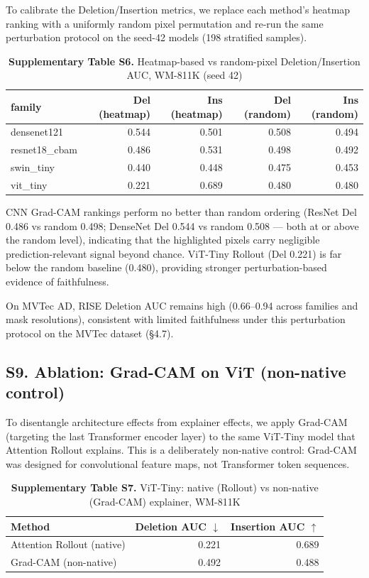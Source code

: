 \documentclass[11pt,a4paper]{article}
\begin{document}
To calibrate the Deletion/Insertion metrics, we replace each method's heatmap ranking with a uniformly random pixel permutation and re-run the same perturbation protocol on the seed-42 models (198 stratified samples).

\begin{table}[htbp]
\centering
\small
\caption{\textbf{Supplementary Table S6.} Heatmap-based vs random-pixel Deletion/Insertion AUC, WM-811K (seed 42)}
\begin{tabular}{lrrrr}
\toprule
family & Del (heatmap) & Ins (heatmap) & Del (random) & Ins (random) \\
\midrule
densenet121 & 0.544 & 0.501 & 0.508 & 0.494 \\
resnet18\_cbam & 0.486 & 0.531 & 0.498 & 0.492 \\
swin\_tiny & 0.440 & 0.448 & 0.475 & 0.453 \\
vit\_tiny & 0.221 & 0.689 & 0.480 & 0.480 \\
\bottomrule
\end{tabular}
\end{table}

CNN Grad-CAM rankings perform no better than random ordering (ResNet Del 0.486 vs random 0.498; DenseNet Del 0.544 vs random 0.508 --- both at or above the random level), indicating that the highlighted pixels carry negligible prediction-relevant signal beyond chance. ViT-Tiny Rollout (Del 0.221) is far below the random baseline (0.480), providing stronger perturbation-based evidence of faithfulness.

On MVTec AD, RISE Deletion AUC remains high (0.66--0.94 across families and mask resolutions), consistent with limited faithfulness under this perturbation protocol on the MVTec dataset (\S{}4.7).

\clearpage
{}
\subsection*{S9. Ablation: Grad-CAM on ViT (non-native control)}

To disentangle architecture effects from explainer effects, we apply Grad-CAM (targeting the last Transformer encoder layer) to the same ViT-Tiny model that Attention Rollout explains. This is a deliberately non-native control: Grad-CAM was designed for convolutional feature maps, not Transformer token sequences.

\begin{table}[htbp]
\centering
\small
\caption{\textbf{Supplementary Table S7.} ViT-Tiny: native (Rollout) vs non-native (Grad-CAM) explainer, WM-811K}
\begin{tabular}{lrr}
\toprule
Method & Deletion AUC $\downarrow$ & Insertion AUC $\uparrow$ \\
\midrule
Attention Rollout (native) & 0.221 & 0.689 \\
Grad-CAM (non-native) & 0.492 & 0.488 \\
\bottomrule
\end{tabular}
\end{table}
\end{document}
